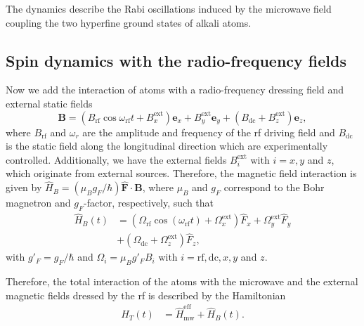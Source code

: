 \documentclass[%
reprint,
 amsmath,amssymb,
 aps,
floatfix,
]{revtex4-1}
\begin{document}
The dynamics describe the Rabi oscillations induced by the microwave field coupling the two hyperfine ground states of alkali atoms.

\subsection{Spin dynamics with the radio-frequency fields\label{Sup:rfDynamics}}
Now we add the interaction of atoms with a radio-frequency dressing field and external static fields 
\begin{equation}
\mathbf{B}=(B_{\mathrm{rf}} \cos{\omega_{\mathrm{rf}} t} +B_x^{\mathrm{ext}})\mathbf{e}_x+B_y^{\mathrm{ext}}\mathbf{e}_y+(B_{\mathrm{dc}}+B_z^{\mathrm{ext}})\mathbf{e}_z,\label{eq:Blab}
\end{equation}
where $B_{\mathrm{rf}}$ and $\omega_r$ are the amplitude and frequency of the rf driving field and $B_{\mathrm{dc}}$ is the static field along the longitudinal direction which are experimentally controlled. Additionally, we have the external fields
$B_i^{\mathrm{ext}}$ with $i=x,y$ and $z$, which originate from external sources. Therefore, 
the magnetic field interaction  is given by $\hat{H}_B=(\mu_Bg_F/\hbar)\hat{\mathbf{F}}\cdot\mathbf{B}$, where $\mu_B$ and $g_F$ correspond to the Bohr magnetron and $g_F$-factor, respectively, such that 
\begin{align}
\hat{H}_B(t)&=(\Omega_{\mathrm{rf}}\cos(\omega_{\mathrm{rf}} t)+\Omega_{x}^{\mathrm{ext}})\hat{F}_x
 + \Omega_y^{\mathrm{ext}}\hat{F}_y\nonumber\\&+(\Omega_{\mathrm{dc}}+\Omega_z^{\mathrm{ext}})\hat{F}_z,\label{eq:HB_int}
\end{align}
with $g'_F=g_F/\hbar$ and $\Omega_i=\mu_B g'_F B_i$ with $i=\mathrm{rf},\mathrm{dc},x,y$ and $z$.

Therefore,  the total interaction of the atoms with the microwave and the external magnetic fields dressed by the rf is described by the Hamiltonian
\begin{align}
\hat{H}_{T}(t)&=\hat{H}_{\mathrm{mw}}^{\mathrm{eff}}+\hat{H}_{B}(t).
\end{align}
\end{document}
